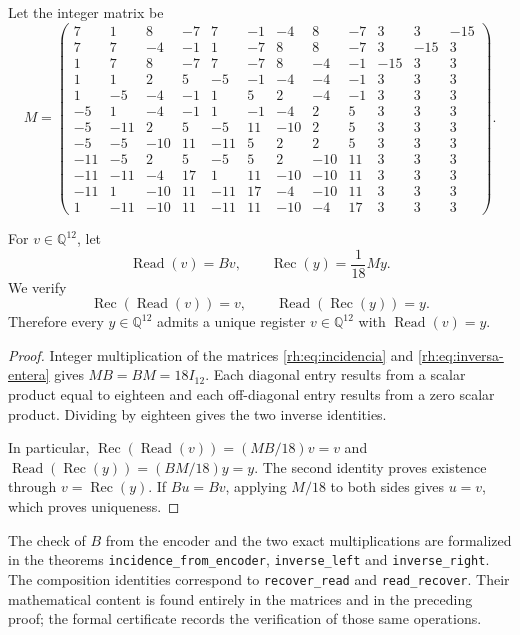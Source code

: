 Let the integer matrix be
\begingroup\small\setlength{\arraycolsep}{3pt}
\setcounter{MaxMatrixCols}{12}
\begin{equation}
M=\begin{pmatrix}
7&1&8&-7&7&-1&-4&8&-7&3&3&-15\\
7&7&-4&-1&1&-7&8&8&-7&3&-15&3\\
1&7&8&-7&7&-7&8&-4&-1&-15&3&3\\
1&1&2&5&-5&-1&-4&-4&-1&3&3&3\\
1&-5&-4&-1&1&5&2&-4&-1&3&3&3\\
-5&1&-4&-1&1&-1&-4&2&5&3&3&3\\
-5&-11&2&5&-5&11&-10&2&5&3&3&3\\
-5&-5&-10&11&-11&5&2&2&5&3&3&3\\
-11&-5&2&5&-5&5&2&-10&11&3&3&3\\
-11&-11&-4&17&1&11&-10&-10&11&3&3&3\\
-11&1&-10&11&-11&17&-4&-10&11&3&3&3\\
1&-11&-10&11&-11&11&-10&-4&17&3&3&3
\end{pmatrix}.
\label{rh:eq:inversa-entera}
\end{equation}
\endgroup

\begin{theorem}
\label{rh:thm:doce}
For $v\in\mathbb Q^{12}$, let
\[
\operatorname{Read}(v)=Bv,
\qquad
\operatorname{Rec}(y)=\frac1{18}My.
\]
We verify
\[
\operatorname{Rec}(\operatorname{Read}(v))=v,
\qquad
\operatorname{Read}(\operatorname{Rec}(y))=y.
\]
Therefore every $y\in\mathbb Q^{12}$ admits a unique register
$v\in\mathbb Q^{12}$ with $\operatorname{Read}(v)=y$.
\end{theorem}
\begin{proof}
Integer multiplication of the matrices
\eqref{rh:eq:incidencia} and \eqref{rh:eq:inversa-entera} gives
$MB=BM=18I_{12}$. Each diagonal entry results from a scalar
product equal to eighteen and each off-diagonal entry results
from a zero scalar product. Dividing by eighteen gives
the two inverse identities.

In particular,
$\operatorname{Rec}(\operatorname{Read}(v))=(MB/18)v=v$ and
$\operatorname{Read}(\operatorname{Rec}(y))=(BM/18)y=y$.
The second identity proves existence through
$v=\operatorname{Rec}(y)$. If $Bu=Bv$, applying $M/18$ to both
sides gives $u=v$, which proves uniqueness.
\end{proof}

The check of $B$ from the encoder and the two exact
multiplications are formalized in the theorems
\texttt{incidence\_from\_encoder}, \texttt{inverse\_left} and
\texttt{inverse\_right}. The composition identities correspond
to \texttt{recover\_read} and \texttt{read\_recover}.
Their mathematical content is found entirely in the matrices and
in the preceding proof; the formal certificate records the verification
of those same operations.

